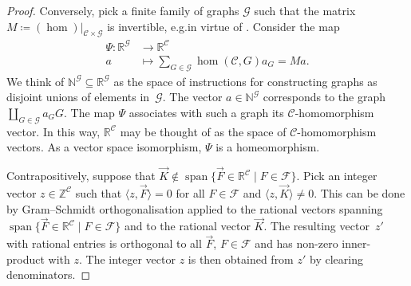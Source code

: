\documentclass[3p,final]{elsarticle}
\DeclareMathOperator{\spn}{span}
\begin{document}
\begin{proof}
		Conversely, pick a finite family of graphs $\mathcal{G}$ such that the matrix $M \coloneqq (\hom)|_{\mathcal{C} \times \mathcal{G}}$ is invertible, e.g.\@ in virtue of \cite[Proposition~5.44(b)]{lovasz_large_2012}. Consider the map
		\begin{align*}
			\Psi \colon \mathbb{R}^{\mathcal{G}} & \to \mathbb{R}^{\mathcal{C}} \\
			a &\mapsto \sum_{G \in \mathcal{G}} \hom(\mathcal{C}, G) a_G = M a.
		\end{align*}
		We think of $\mathbb{N}^{\mathcal{G}} \subseteq \mathbb{R}^{\mathcal{G}}$ as the space of instructions for constructing graphs as disjoint unions of elements in~$\mathcal{G}$. The vector $a \in \mathbb{N}^{\mathcal{G}}$ corresponds to the graph $\coprod_{G \in \mathcal{G}} a_G G$.
		The map $\Psi$ associates with such a graph its $\mathcal{C}$-homomorphism vector. In this way, $\mathbb{R}^{\mathcal{C}}$ may be thought of as the space of $\mathcal{C}$-homomorphism vectors.
		As a vector space isomorphism, $\Psi$ is a homeomorphism.
		
		Contrapositively, suppose that $\vec{K} \not\in \spn \{\vec{F} \in \mathbb{R}^{\mathcal{C}} \mid F \in \mathcal{F}\}$.
		Pick an integer vector $z \in \mathbb{Z}^{\mathcal{C}}$ such that $\langle z, \vec{F} \rangle = 0$ for all $F \in \mathcal{F}$ and $\langle z, \vec{K} \rangle \neq 0$.
		This can be done by Gram--Schmidt orthogonalisation applied to the rational vectors spanning $\spn \{\vec{F} \in \mathbb{R}^{\mathcal{C}} \mid F \in \mathcal{F}\}$ and to the rational vector $\vec{K}$.
		The resulting vector~$z'$ with rational entries is orthogonal to all $\vec{F}$, $F \in \mathcal{F}$ and has non-zero inner-product with $z$. The integer vector $z$ is then obtained from $z'$ by clearing denominators.
		

\end{proof}
\end{document}
